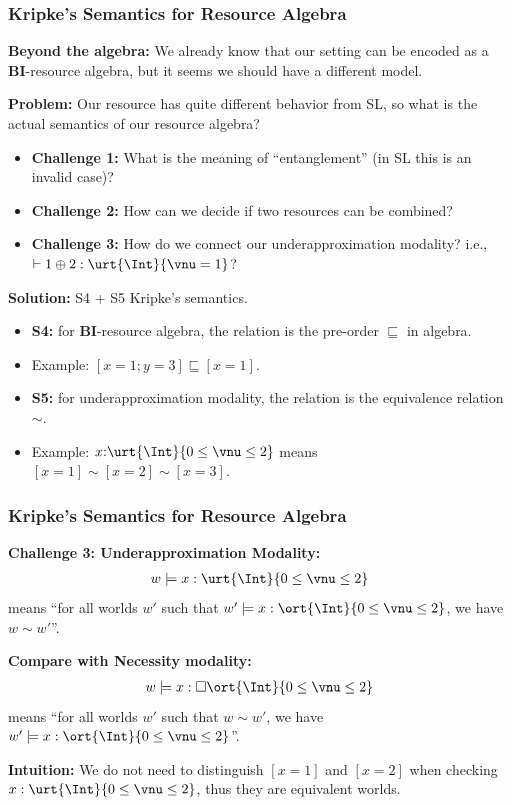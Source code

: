 \begin{frame}[fragile]
    \frametitle{Kripke's Semantics for Resource Algebra}

\textbf{Beyond the algebra:} We already know that our setting can be encoded as a \textbf{BI}-resource algebra, but it seems we should have a different model.

\textbf{Problem:} Our resource has quite different behavior from SL, so what is the actual semantics of our resource algebra?
\begin{itemize}
    \item \textbf{Challenge 1:} What is the meaning of ``entanglement'' (in SL this is an invalid case)?
    \item \textbf{Challenge 2:} How can we decide if two resources can be combined?
    \item \textbf{Challenge 3:} How do we connect our underapproximation modality? i.e., $\vdash 1 \oplus 2 : \urt{\Int}{\vnu = 1}$?
\end{itemize}

\textbf{Solution:} S4 + S5 Kripke's semantics.
\begin{itemize}
    \item \textbf{S4:} for \textbf{BI}-resource algebra, the relation is the pre-order $\sqsubseteq$ in algebra.
    \item Example: $[x=1;y=3] \sqsubseteq [x = 1]$.
    \item \textbf{S5:} for underapproximation modality, the relation is the equivalence relation $\sim$.
    \item Example: $x{:}\urt{\Int}{0 \leq \vnu \leq 2}$ means $[x=1] \sim [x=2] \sim [x=3]$.
\end{itemize}

\end{frame}

\begin{frame}[fragile]
    \frametitle{Kripke's Semantics for Resource Algebra}

\textbf{Challenge 3: Underapproximation Modality:}
\begin{align*}
    w \models x : \urt{\Int}{0 \leq \vnu \leq 2}
\end{align*}\noindent
means ``for all worlds $w'$ such that $w' \models x : \ort{\Int}{0 \leq \vnu \leq 2}$, we have $w \sim w'$''.

\textbf{Compare with Necessity modality:}
\begin{align*}
    w \models x : \square\ort{\Int}{0 \leq \vnu \leq 2}
\end{align*}\noindent
means ``for all worlds $w'$ such that $w \sim w'$, we have $w' \models x : \ort{\Int}{0 \leq \vnu \leq 2}$''.

\textbf{Intuition:} We do not need to distinguish $[x = 1]$ and $[x = 2]$ when checking $x : \urt{\Int}{0 \leq \vnu \leq 2}$, thus they are equivalent worlds. 
\end{frame}

